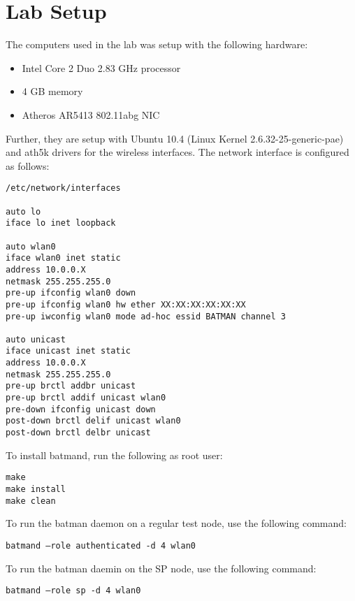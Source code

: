\chapter{Lab Setup}
\label{appendix:lab_setup}


The computers used in the lab was setup with the following hardware:

\begin{itemize}
\item Intel Core 2 Duo 2.83 GHz processor
\item 4 GB memory
\item Atheros AR5413 802.11abg NIC
\end{itemize}

\noindent
Further, they are setup with Ubuntu 10.4 (Linux Kernel 2.6.32-25-generic-pae) and ath5k drivers for the wireless interfaces. The network interface is configured as follows:


\begin{lstlisting}[frame=tb]
/etc/network/interfaces

auto lo
iface lo inet loopback

auto wlan0
iface wlan0 inet static
address 10.0.0.X
netmask 255.255.255.0
pre-up ifconfig wlan0 down
pre-up ifconfig wlan0 hw ether XX:XX:XX:XX:XX:XX
pre-up iwconfig wlan0 mode ad-hoc essid BATMAN channel 3

auto unicast
iface unicast inet static
address 10.0.0.X
netmask 255.255.255.0
pre-up brctl addbr unicast
pre-up brctl addif unicast wlan0
pre-down ifconfig unicast down
post-down brctl delif unicast wlan0
post-down brctl delbr unicast
\end{lstlisting}

To install batmand, run the following as root user:

\begin{lstlisting}[frame=tb]
make
make install
make clean
\end{lstlisting}

To run the batman daemon on a regular test node, use the following command:

\texttt{batmand --role authenticated -d 4 wlan0}

To run the batman daemin on the SP node, use the following command:

\texttt{batmand --role sp -d 4 wlan0}